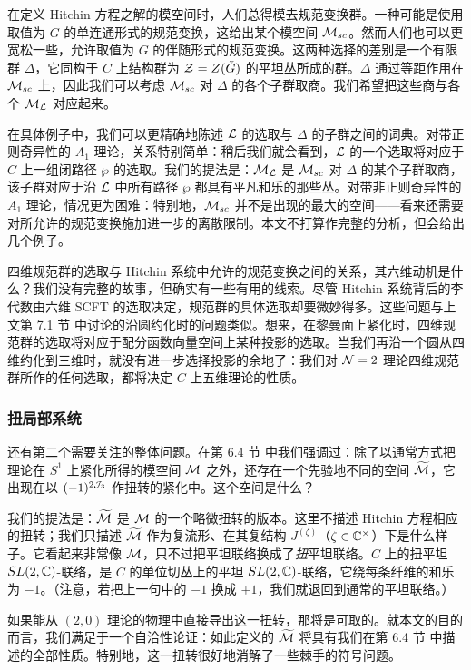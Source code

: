 在定义 Hitchin 方程之解的模空间时，人们总得模去规范变换群。一种可能是使用取值为 $G$ 的单连通形式的规范变换，这给出某个模空间 $\mathcal{M}_{sc}$。然而人们也可以更宽松一些，允许取值为 $G$ 的伴随形式的规范变换。这两种选择的差别是一个有限群 $\Delta$，它同构于 $C$ 上结构群为 $\mathcal{Z}=Z(\tilde G)$ 的平坦丛所成的群。$\Delta$ 通过等距作用在 $\mathcal{M}_{sc}$ 上，因此我们可以考虑 $\mathcal{M}_{sc}$ 对 $\Delta$ 的各个子群取商。我们希望把这些商与各个 $\mathcal{M}_{\mathcal{L}}$ 对应起来。

在具体例子中，我们可以更精确地陈述 $\mathcal{L}$ 的选取与 $\Delta$ 的子群之间的词典。对带正则奇异性的 $A_1$ 理论，关系特别简单：稍后我们就会看到，$\mathcal{L}$ 的一个选取将对应于 $C$ 上一组闭路径 $\wp$ 的选取。我们的提法是：$\mathcal{M}_{\mathcal{L}}$ 是 $\mathcal{M}_{sc}$ 对 $\Delta$ 的某个子群取商，该子群对应于沿 $\mathcal{L}$ 中所有路径 $\wp$ 都具有平凡和乐的那些丛。对带非正则奇异性的 $A_1$ 理论，情况更为困难：特别地，$\mathcal{M}_{sc}$ 并不是出现的最大的空间——看来还需要对所允许的规范变换施加进一步的离散限制。本文不打算作完整的分析，但会给出几个例子。

四维规范群的选取与 Hitchin 系统中允许的规范变换之间的关系，其六维动机是什么？我们没有完整的故事，但确实有一些有用的线索。尽管 Hitchin 系统背后的李代数由六维 SCFT 的选取决定，规范群的具体选取却要微妙得多。这些问题与上文第 7.1 节%
中讨论的沿圆约化时的问题类似。想来，在黎曼面上紧化时，四维规范群的选取将对应于配分函数向量空间上某种投影的选取。当我们再沿一个圆从四维约化到三维时，就没有进一步选择投影的余地了：我们对 $\mathcal{N}=2$ 理论四维规范群所作的任何选取，都将决定 $C$ 上五维理论的性质。

\subsubsection{扭局部系统} \label{sec:twisted-loc}

还有第二个需要关注的整体问题。在第 6.4 节%
中我们强调过：除了以通常方式把理论在 $S^1$ 上紧化所得的模空间 $\mathcal{M}$ 之外，还存在一个先验地不同的空间 $\widetilde{\cal M}$，它出现在以 $(-1)^{2\mathcal{J}_3}$ 作扭转的紧化中。这个空间是什么？

我们的提法是：$\widetilde{\cal M}$ 是 $\mathcal{M}$ 的一个略微扭转的版本。这里不描述 Hitchin 方程相应的扭转；我们只描述 $\widetilde{\cal M}$ 作为复流形、在其复结构 $J^{(\zeta)}$（$\zeta\in\mathbb{C}^\times$）下是什么样子。它看起来非常像 $\mathcal{M}$，只不过把平坦联络换成了\emph{扭}平坦联络。$C$ 上的扭平坦 $SL(2,\mathbb{C})$-联络，是 $C$ 的单位切丛上的平坦 $SL(2,\mathbb{C})$-联络，它绕每条纤维的和乐为 $-1$。（注意，若把上一句中的 $-1$ 换成 $+1$，我们就退回到通常的平坦联络。）

如果能从 $(2,0)$ 理论的物理中直接导出这一扭转，那将是可取的。就本文的目的而言，我们满足于一个自洽性论证：如此定义的 $\widetilde{\cal M}$ 将具有我们在第 6.4 节%
中描述的全部性质。特别地，这一扭转很好地消解了一些棘手的符号问题。

